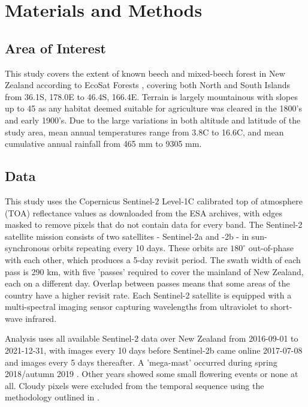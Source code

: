 \documentclass[remotesensing,article,submit,moreauthors,pdftex]{Definitions/mdpi}
\begin{document}

\section{Materials and Methods}

\subsection{Area of Interest}
This study covers the extent of known beech and mixed-beech forest in New Zealand according to EcoSat Forests \citep{Shepherd2005,Dymond2004,ecosatnorth,ecosatsouth}, covering both North and South Islands from 36.1\degree{}S, 178.0\degree{}E to 46.4\degree{}S, 166.4\degree{}E. Terrain is largely mountainous with slopes up to 45\degree{} as any habitat deemed suitable for agriculture was cleared in the 1800's and early 1900's. Due to the large variations in both altitude and latitude of the study area, mean annual temperatures range from 3.8\degree{}C to 16.6\degree{}C, and mean cumulative annual rainfall from 465 mm to 9305 mm.

\subsection{Data}
This study uses the Copernicus Sentinel-2 Level-1C calibrated top of atmosphere (TOA) reflectance values as downloaded from the ESA archives, with edges masked to remove pixels that do not contain data for every band. The Sentinel-2 satellite mission consists of two satellites - Sentinel-2a and -2b - in sun-synchronous orbits repeating every 10 days. These orbits are $180^\circ$ out-of-phase with each other, which produces a 5-day revisit period. The swath width of each pass is 290 km, with five 'passes' required to cover the mainland of New Zealand, each on a different day. Overlap between passes means that some areas of the country have a higher revisit rate. Each Sentinel-2 satellite is equipped with a multi-spectral imaging sensor capturing wavelengths from ultraviolet to short-wave infrared.

Analysis uses all available Sentinel-2 data over New Zealand from 2016-09-01 to 2021-12-31, with images every 10 days before Sentinel-2b came online 2017-07-08 and images every 5 days thereafter. A 'mega-mast' occurred during spring 2018/autumn 2019 \citep{DOC2019flowering, DOC2019}. Other years showed some small flowering events or none at all. Cloudy pixels were excluded from the temporal sequence using the methodology outlined in \citet{Shepherd2020}.
\end{document}
